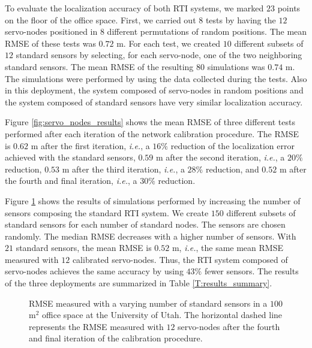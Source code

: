 \documentclass[conference]{IEEEtran}
\begin{document}
To evaluate the localization accuracy of both RTI systems, we marked $23$ points on the floor of the office space. First, we carried out $8$ tests by having the $12$ servo-nodes positioned in $8$ different permutations of random positions. The mean RMSE of these tests was $0.72$ m. For each test, we created $10$ different subsets of $12$ standard sensors by selecting, for each servo-node, one of the two neighboring standard sensors. The mean RMSE of the resulting $80$ simulations was $0.74$ m. The simulations were performed by using the data collected during the tests. Also in this deployment, the system composed of servo-nodes in random positions and the system composed of standard sensors have very similar localization accuracy.

Figure \ref{fig:servo_nodes_results} shows the mean RMSE of three different tests performed after each iteration of the network calibration procedure. The RMSE is $0.62$ m after the first iteration, \emph{i.e.}, a $16\%$ reduction of the localization error achieved with the standard sensors, $0.59$ m after the second iteration, \emph{i.e.}, a $20\%$ reduction, $0.53$ m after the third iteration, \emph{i.e.}, a $28\%$ reduction, and $0.52$ m after the fourth and final iteration, \emph{i.e.}, a $30\%$ reduction.

Figure \ref{fig:large_room_sims_more_nodes} shows the results of simulations performed by increasing the number of sensors composing the standard RTI system. We create $150$ different subsets of standard sensors for each number of standard nodes. The sensors are chosen randomly. The median RMSE decreases with a higher number of sensors. With $21$ standard sensors, the mean RMSE is $0.52$ m, \emph{i.e.}, the same mean RMSE measured with $12$ calibrated servo-nodes. Thus, the RTI system composed of servo-nodes achieves the same accuracy by using $43\%$ fewer sensors. The results of the three deployments are summarized in Table \ref{T:results_summary}.





\begin{figure}
    \begin{center}
        \caption{RMSE measured with a varying number of standard sensors in a $100$ m$^2$ office space at the University of Utah. The horizontal dashed line represents the RMSE measured with $12$ servo-nodes after the fourth and final iteration of the calibration procedure.}
        \label{fig:large_room_sims_more_nodes}
    \end{center}
\end{figure}
\end{document}
